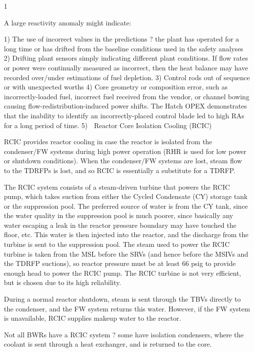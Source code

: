 \documentclass[10pt]{article}
\begin{document}
  1%

A large reactivity anomaly might indicate:

1)	The use of incorrect values in the predictions ? the plant has operated for a long time or has drifted from the baseline conditions used in the safety analyses
2)	Drifting plant sensors simply indicating different plant conditions. If flow rates or power were continually measured as incorrect, then the heat balance may have recorded over/under estimations of fuel depletion. 
3)	Control rods out of sequence or with unexpected worths
4)	Core geometry or composition error, such as incorrectly-loaded fuel, incorrect fuel received from the vendor, or channel bowing causing flow-redistribution-induced power shifts. The Hatch OPEX demonstrates that the inability to identify an incorrectly-placed control blade led to high RAs for a long period of time. 
5)	
Reactor Core Isolation Cooling (RCIC)

RCIC provides reactor cooling in case the reactor is isolated from the condenser/FW systems during high power operation (RHR is used for low power or shutdown conditions). When the condenser/FW systems are lost, steam flow to the TDRFPs is lost, and so RCIC is essentially a substitute for a TDRFP. 

The RCIC system consists of a steam-driven turbine that powers the RCIC pump, which takes suction from either the Cycled Condensate (CY) storage tank or the suppression pool. The preferred source of water is from the CY tank, since the water quality in the suppression pool is much poorer, since basically any water escaping a leak in the reactor pressure boundary may have touched the floor, etc. This water is then injected into the reactor, and the discharge from the turbine is sent to the suppression pool. The steam used to power the RCIC turbine is taken from the MSL before the SRVs (and hence before the MSIVs and the TDRFP suctions), so reactor pressure must be at least 66 psig to provide enough head to power the RCIC pump. The RCIC turbine is not very efficient, but is chosen due to its high reliability. 

During a normal reactor shutdown, steam is sent through the TBVs directly to the condenser, and the FW system returns this water. However, if the FW system is unavailable, RCIC supplies makeup water to the reactor. 

Not all BWRs have a RCIC system ? some have isolation condensers, where the coolant is sent through a heat exchanger, and is returned to the core. 
\end{document}
